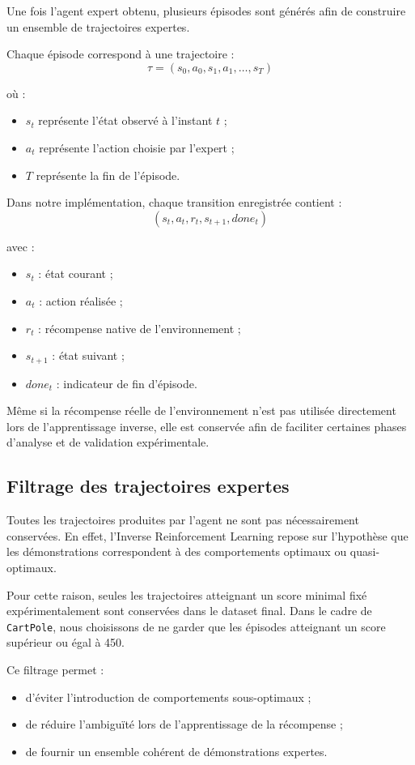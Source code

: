 Une fois l’agent expert obtenu, plusieurs épisodes sont générés afin de construire un ensemble de trajectoires expertes.

Chaque épisode correspond à une trajectoire :
\[
\tau = (s_0,a_0,s_1,a_1,\dots,s_T)
\]

où :
\begin{itemize}
    \item \(s_t\) représente l’état observé à l’instant \(t\) ;
    \item \(a_t\) représente l’action choisie par l’expert ;
    \item \(T\) représente la fin de l’épisode.
\end{itemize}

Dans notre implémentation, chaque transition enregistrée contient :
\[
(s_t,a_t,r_t,s_{t+1},done_t)
\]

avec :
\begin{itemize}
    \item \(s_t\) : état courant ;
    \item \(a_t\) : action réalisée ;
    \item \(r_t\) : récompense native de l’environnement ;
    \item \(s_{t+1}\) : état suivant ;
    \item \(done_t\) : indicateur de fin d’épisode.
\end{itemize}

Même si la récompense réelle de l’environnement n’est pas utilisée directement lors de l’apprentissage inverse, elle est conservée afin de faciliter certaines phases d’analyse et de validation expérimentale.

\subsection{Filtrage des trajectoires expertes}

Toutes les trajectoires produites par l’agent ne sont pas nécessairement conservées. En effet, l’Inverse Reinforcement Learning repose sur l’hypothèse que les démonstrations correspondent à des comportements optimaux ou quasi-optimaux.

Pour cette raison, seules les trajectoires atteignant un score minimal fixé expérimentalement sont conservées dans le dataset final. Dans le cadre de \texttt{CartPole}, nous choisissons de ne garder que les épisodes atteignant un score supérieur ou égal à 450.

Ce filtrage permet :
\begin{itemize}
    \item d’éviter l’introduction de comportements sous-optimaux ;
    \item de réduire l’ambiguïté lors de l’apprentissage de la récompense ;
    \item de fournir un ensemble cohérent de démonstrations expertes.
\end{itemize}

